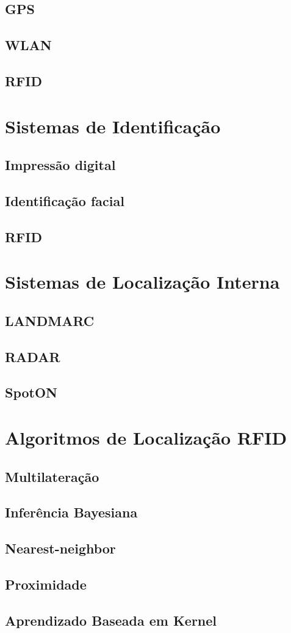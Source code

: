     \subsection{GPS}
    \subsection{WLAN}
    \subsection{RFID}
\section{Sistemas de Identificação}
    \subsection{Impressão digital}
    \subsection{Identificação facial}
    \subsection{RFID}
\section{Sistemas de Localização Interna}
    \subsection{LANDMARC}
    \subsection{RADAR}
    \subsection{SpotON}
\section{Algoritmos de Localização RFID}
    \subsection{Multilateração}
    \subsection{Inferência Bayesiana}
    \subsection{Nearest-neighbor}
    \subsection{Proximidade}
    \subsection{Aprendizado Baseada em Kernel}